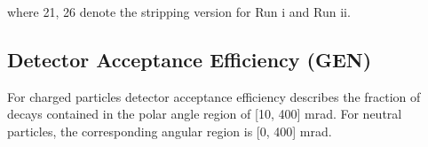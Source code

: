 

 where 21, 26 denote the stripping version for Run \Rn{1} and Run \Rn{2}.


\subsection{Detector Acceptance Efficiency (GEN)}
For charged particles detector acceptance efficiency describes the fraction of decays contained in the polar angle region of [10, 400] mrad. For neutral particles, the corresponding angular region is [0, 400] mrad. 

